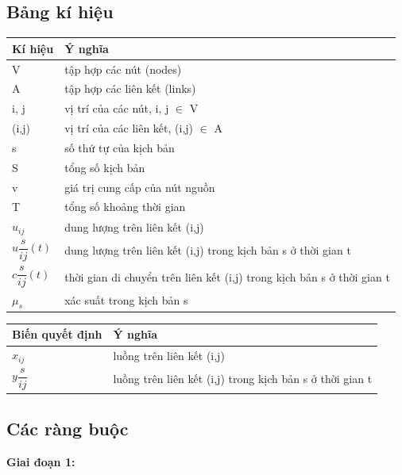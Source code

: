 \documentclass[a4paper]{article}
\begin{document}
    \subsection{Bảng kí hiệu}

    \begin{center}
        \begin{tabular}{ll}
            \toprule
            Kí hiệu & Ý nghĩa\\
            \midrule
            V & tập hợp các nút (nodes)\\
            A & tập hợp các liên kết (links)\\
            i, j & vị trí của các nút, i, j $\in$ V\\
            (i,j) & vị trí của các liên kết, (i,j) $\in$ A\\
            s & số thứ tự của kịch bản\\
            S & tổng số kịch bản\\
            v & giá trị cung cấp của nút nguồn\\
            T & tổng số khoảng thời gian\\
            $u_{ij}$ & dung lượng trên liên kết (i,j)\\
            $u\dfrac{s}{ij}(t)$ & dung lượng trên liên kết (i,j) trong kịch bản s ở thời gian t\\
            $c\dfrac{s}{ij}(t)$ & thời gian di chuyển trên liên kết (i,j) trong kịch bản s ở thời gian t\\
            $\mu_s$ & xác suất trong kịch bản s\\
            \bottomrule
        \end{tabular}
        
        \begin{tabular}{ll}
            \toprule
            Biến quyết định & Ý nghĩa\\
            \midrule
            $x_{ij}$ & luồng trên liên kết (i,j)\\
            $y\dfrac{s}{ij}$ & luồng trên liên kết (i,j) trong kịch bản s ở thời gian t\\
            \bottomrule
        \end{tabular}
    \end{center}

    \subsection{Các ràng buộc}

    \textbf{Giai đoạn 1:}
\end{document}
